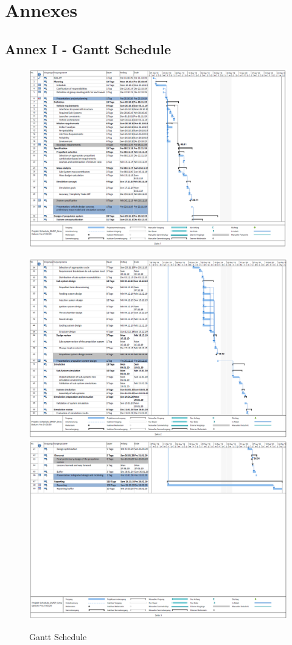 \chapter*{Annexes}
\section*{Annex I - Gantt Schedule}
\label{sec:annex1}
\begin{figure}[H]
	\centering
	\includegraphics[width=\linewidth]{gantt1}
\end{figure}
\pagebreak
\thispagestyle{empty}
\begin{figure}[H]
	\centering
	\includegraphics[width=\linewidth]{gantt2}
	\includegraphics[width=\linewidth]{gantt3}
	\caption{Gantt Schedule}
\end{figure}